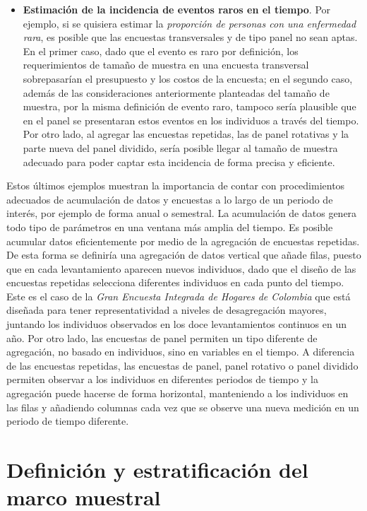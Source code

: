 \documentclass[
  12pt,
  spanish,
]{book}
\begin{document}
\begin{itemize}
\item
  \textbf{Estimación de la incidencia de eventos raros en el tiempo}. Por ejemplo, si se quisiera estimar la \emph{proporción de personas con una enfermedad rara}, es posible que las encuestas transversales y de tipo panel no sean aptas. En el primer caso, dado que el evento es raro por definición, los requerimientos de tamaño de muestra en una encuesta transversal sobrepasarían el presupuesto y los costos de la encuesta; en el segundo caso, además de las consideraciones anteriormente planteadas del tamaño de muestra, por la misma definición de evento raro, tampoco sería plausible que en el panel se presentaran estos eventos en los individuos a través del tiempo. Por otro lado, al agregar las encuestas repetidas, las de panel rotativas y la parte nueva del panel dividido, sería posible llegar al tamaño de muestra adecuado para poder captar esta incidencia de forma precisa y eficiente.
\end{itemize}

Estos últimos ejemplos muestran la importancia de contar con procedimientos adecuados de acumulación de datos y encuestas a lo largo de un periodo de interés, por ejemplo de forma anual o semestral. La acumulación de datos genera todo tipo de parámetros en una ventana más amplia del tiempo. Es posible acumular datos eficientemente por medio de la agregación de encuestas repetidas. De esta forma se definiría una agregación de datos vertical que añade filas, puesto que en cada levantamiento aparecen nuevos individuos, dado que el diseño de las encuestas repetidas selecciona diferentes individuos en cada punto del tiempo. Este es el caso de la \emph{Gran Encuesta Integrada de Hogares de Colombia} que está diseñada para tener representatividad a niveles de desagregación mayores, juntando los individuos observados en los doce levantamientos continuos en un año. Por otro lado, las encuestas de panel permiten un tipo diferente de agregación, no basado en individuos, sino en variables en el tiempo. A diferencia de las encuestas repetidas, las encuestas de panel, panel rotativo o panel dividido permiten observar a los individuos en diferentes periodos de tiempo y la agregación puede hacerse de forma horizontal, manteniendo a los individuos en las filas y añadiendo columnas cada vez que se observe una nueva medición en un periodo de tiempo diferente.

\hypertarget{definiciuxf3n-y-estratificaciuxf3n-del-marco-muestral}{%
\chapter{Definición y estratificación del marco muestral}\label{definiciuxf3n-y-estratificaciuxf3n-del-marco-muestral}}
\end{document}
